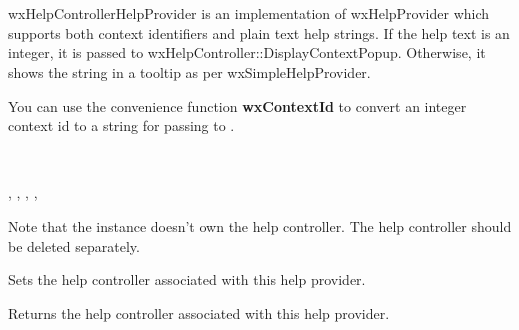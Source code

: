 \section{}\label{wxhelpcontrollerhelpprovider}

wxHelpControllerHelpProvider is an implementation of wxHelpProvider which supports
both context identifiers and plain text help strings. If the help text is an integer,
it is passed to wxHelpController::DisplayContextPopup. Otherwise, it shows the string
in a tooltip as per wxSimpleHelpProvider.

You can use the convenience function {\bf wxContextId} to convert an integer context
id to a string for passing to .


\\


, , 
, , 


\label{wxhelpcontrollerhelpproviderwxhelpcontrollerhelpprovider}


Note that the instance doesn't own the help controller. The help controller
should be deleted separately.

\label{wxhelpcontrollerhelpprovidersethelpcontroller}


Sets the help controller associated with this help provider.

\label{wxhelpcontrollerhelpprovidergethelpcontroller}


Returns the help controller associated with this help provider.

